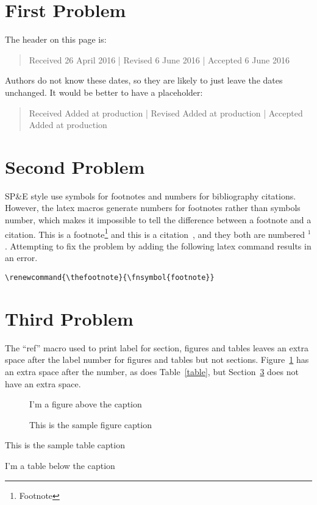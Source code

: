 \documentclass[AMA,STIX1COL]{WileyNJD-v2}
\renewcommand{\thefootnote}{\fnsymbol{footnote}}
\begin{document}
\section{First Problem}

The header on this page is:
\begin{quote}
Received {\color{red}26 April 2016} | Revised {\color{red}6 June 2016} | Accepted {\color{red}6 June 2016}
\end{quote}
Authors do not know these dates, so they are likely to just leave the dates unchanged.
It would be better to have a placeholder:
\begin{quote}
Received {\color{red}Added at production} | Revised {\color{red}Added at production} | Accepted {\color{red}Added at production}
\end{quote}


\section{Second Problem}

SP\&E style use symbols for footnotes and numbers for bibliography citations.
However, the latex macros generate numbers for footnotes rather than symbols number, which makes it impossible to tell the difference between a footnote and a citation.
This is a footnote\footnote{Footnote} and this is a citation~\cite{book01}, and they both are numbered $^1$.
Attempting to fix the problem by adding the following latex command results in an error.
\begin{verbatim}
\renewcommand{\thefootnote}{\fnsymbol{footnote}}
\end{verbatim}


\section{Third Problem}\label{section}

The ``ref'' macro used to print label for section, figures and tables leaves an extra space after the label number for figures and tables but not sections.
Figure~\ref{figure} has an extra space after the number, as does Table~\ref{table}, but Section~\ref{section} does not have an extra space.

\begin{figure}
\centering
I'm a figure above the caption
\caption{This is the sample figure caption}
\label{figure}
\end{figure}

\begin{table}
\caption{This is the sample table caption}
\label{table}
\centering
I'm a table below the caption
\end{table}
\end{document}
